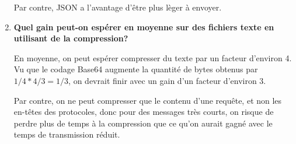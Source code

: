 \documentclass{article}
\begin{document}
\begin{enumerate}
      Par contre, JSON a l'avantage d'être plus lèger à envoyer.

    \item \textbf{Quel gain peut-on espérer en moyenne sur des fichiers texte en utilisant de la compression?}
      
      En moyenne, on peut espérer compresser du texte par un facteur d'environ 4. Vu que le codage Base64 augmente la quantité de bytes obtenus par $1/4 * 4/3 = 1/3$, on devrait finir avec un gain d'un facteur d'environ 3.
	  
	  Par contre, on ne peut compresser que le contenu d'une requête, et non les en-têtes des protocoles, donc pour des messages très courts, on risque de perdre plus de temps à la compression que ce qu'on aurait gagné avec le temps de transmission réduit.

  \end{enumerate}
\end{document}
